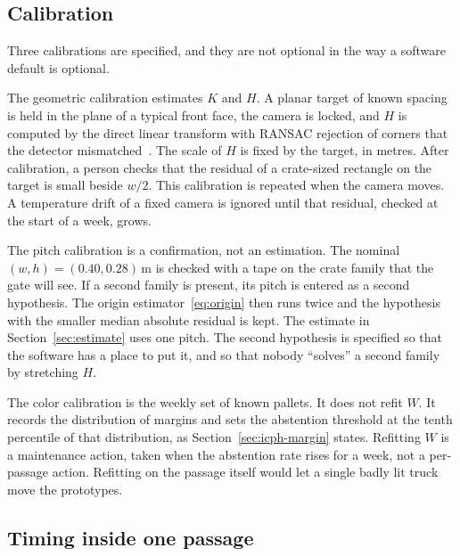\subsection{Calibration}
\label{sec:calibration}

Three calibrations are specified, and they are not optional in the way a software default is optional.

The geometric calibration estimates $K$ and $H$. A planar target of known spacing is held in the plane of a typical front face, the camera is locked, and $H$ is computed by the direct linear transform with RANSAC rejection of corners that the detector mismatched~\cite{zhang2000calibration,hartley2004mvg,fischler1981ransac}. The scale of $H$ is fixed by the target, in metres. After calibration, a person checks that the residual of a crate-sized rectangle on the target is small beside $w/2$. This calibration is repeated when the camera moves. A temperature drift of a fixed camera is ignored until that residual, checked at the start of a week, grows.

The pitch calibration is a confirmation, not an estimation. The nominal $(w,h)=(0.40,0.28)\,\mathrm{m}$ is checked with a tape on the crate family that the gate will see. If a second family is present, its pitch is entered as a second hypothesis. The origin estimator~\eqref{eq:origin} then runs twice and the hypothesis with the smaller median absolute residual is kept. The estimate in Section~\ref{sec:estimate} uses one pitch. The second hypothesis is specified so that the software has a place to put it, and so that nobody ``solves'' a second family by stretching $H$.

The color calibration is the weekly set of known pallets. It does not refit $W$. It records the distribution of margins and sets the abstention threshold at the tenth percentile of that distribution, as Section~\ref{sec:icph-margin} states. Refitting $W$ is a maintenance action, taken when the abstention rate rises for a week, not a per-passage action. Refitting on the passage itself would let a single badly lit truck move the prototypes.

\subsection{Timing inside one passage}
\label{sec:timing}

